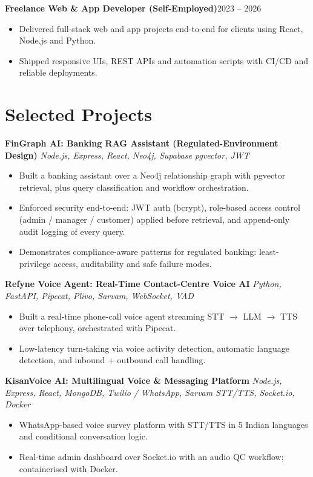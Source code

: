 \documentclass[10pt,a4paper]{article}
\newcommand{\entry}[2]{\textbf{#1}\hfill{#2}\par}
\begin{document}
\vspace{1pt}
\entry{Freelance Web \& App Developer (Self-Employed)}{2023 -- 2026}
\begin{itemize}
  \item Delivered full-stack web and app projects end-to-end for clients using React, Node.js and Python.
  \item Shipped responsive UIs, REST APIs and automation scripts with CI/CD and reliable deployments.
\end{itemize}

\section{Selected Projects}

\textbf{FinGraph AI: Banking RAG Assistant (Regulated-Environment Design)} \textit{Node.js, Express, React, Neo4j, Supabase pgvector, JWT}
\begin{itemize}
  \item Built a banking assistant over a Neo4j relationship graph with pgvector retrieval, plus query classification and workflow orchestration.
  \item Enforced security end-to-end: JWT auth (bcrypt), role-based access control (admin / manager / customer) applied before retrieval, and append-only audit logging of every query.
  \item Demonstrates compliance-aware patterns for regulated banking: least-privilege access, auditability and safe failure modes.
\end{itemize}

\vspace{1pt}
\textbf{Refyne Voice Agent: Real-Time Contact-Centre Voice AI} \textit{Python, FastAPI, Pipecat, Plivo, Sarvam, WebSocket, VAD}
\begin{itemize}
  \item Built a real-time phone-call voice agent streaming STT $\rightarrow$ LLM $\rightarrow$ TTS over telephony, orchestrated with Pipecat.
  \item Low-latency turn-taking via voice activity detection, automatic language detection, and inbound + outbound call handling.
\end{itemize}

\vspace{1pt}
\textbf{KisanVoice AI: Multilingual Voice \& Messaging Platform} \textit{Node.js, Express, React, MongoDB, Twilio / WhatsApp, Sarvam STT/TTS, Socket.io, Docker}
\begin{itemize}
  \item WhatsApp-based voice survey platform with STT/TTS in 5 Indian languages and conditional conversation logic.
  \item Real-time admin dashboard over Socket.io with an audio QC workflow; containerised with Docker.
\end{itemize}
\end{document}
